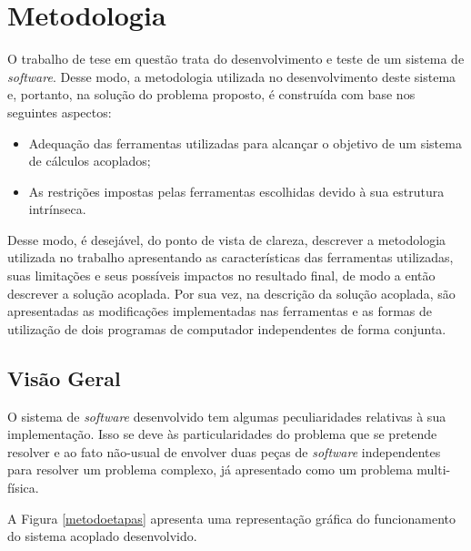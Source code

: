 \chapter{Metodologia}
\label{chap:metodologia}

O trabalho de tese em questão trata do desenvolvimento e teste
de um sistema de \textit{software}. Desse modo, a metodologia utilizada no desenvolvimento
deste sistema e, portanto, na solução do problema proposto,
é construída com base nos seguintes aspectos:

\begin{itemize}
\item Adequação das ferramentas utilizadas para alcançar o objetivo de um sistema de cálculos acoplados;
\item As restrições impostas pelas ferramentas escolhidas devido à sua estrutura intrínseca.
\end{itemize}

Desse modo, é desejável, do ponto de vista de clareza, descrever a metodologia utilizada no trabalho
apresentando as características das ferramentas utilizadas, suas limitações e seus possíveis impactos
no resultado final, de modo a então descrever a solução acoplada. Por sua vez, na descrição da solução
acoplada, são apresentadas as modificações implementadas nas ferramentas e as formas de utilização
de dois programas de computador independentes de forma conjunta.


\section{Visão Geral}

O sistema de \textit{software} desenvolvido tem algumas peculiaridades relativas à sua
implementação. Isso se deve às particularidades do problema que se pretende resolver e ao
fato não-usual de envolver duas peças de \textit{software} independentes para resolver
um problema complexo, já apresentado como um problema multi-física.

A Figura \ref{metodoetapas} apresenta uma representação gráfica do funcionamento do sistema
acoplado desenvolvido.

